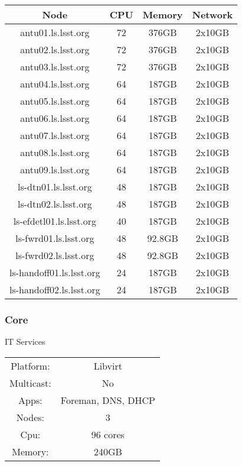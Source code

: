 \begin{center}
  \begin{tabular}{||c c c c||} 
    \hline
    Node & CPU & Memory & Network \\ [0.5ex] 
    \hline\hline
    antu01.ls.lsst.org & 72 & 376GB & 2x10GB \\
    \hline
    antu02.ls.lsst.org & 72 & 376GB & 2x10GB \\
    \hline
    antu03.ls.lsst.org & 72 & 376GB & 2x10GB \\
    \hline
    antu04.ls.lsst.org & 64 & 187GB & 2x10GB \\
    \hline
    antu05.ls.lsst.org & 64 & 187GB & 2x10GB \\
    \hline
    antu06.ls.lsst.org & 64 & 187GB & 2x10GB \\
    \hline
    antu07.ls.lsst.org & 64 & 187GB & 2x10GB \\
    \hline
    antu08.ls.lsst.org & 64 & 187GB & 2x10GB \\
    \hline
    antu09.ls.lsst.org & 64 & 187GB & 2x10GB \\
    \hline
    ls-dtn01.ls.lsst.org & 48 & 187GB & 2x10GB \\
    \hline
    ls-dtn02.ls.lsst.org & 48 & 187GB & 2x10GB \\
    \hline
    ls-efdetl01.ls.lsst.org & 40 & 187GB & 2x10GB \\
    \hline
    ls-fwrd01.ls.lsst.org & 48 & 92.8GB & 2x10GB \\
    \hline
    ls-fwrd02.ls.lsst.org & 48 & 92.8GB & 2x10GB \\
    \hline
    ls-handoff01.ls.lsst.org & 24 & 187GB & 2x10GB \\
    \hline
    ls-handoff02.ls.lsst.org & 24 & 187GB & 2x10GB \\
    \hline
  \end{tabular}
\end{center}

\newpage
\subsubsection{Core}

IT Services

\begin{center}
  \begin{tabular}{ |c|c| } 
   \hline
   Platform: & Libvirt \\ 
   Multicast: & No \\ 
   Apps: & Foreman, DNS, DHCP \\ 
   Nodes: & 3 \\ 
   Cpu: & 96 cores \\ 
   Memory: & 240GB \\ 
   \hline
  \end{tabular}
\end{center}

